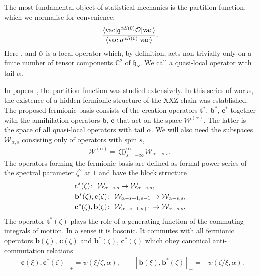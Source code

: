 \documentclass[pdftex]{sigma}
\numberwithin{equation}{section}
\begin{document}
The most fundamental object of statistical mechanics is the partition function, which we normalise for convenience:
\begin{align*}
\frac{\langle{\rm vac}| q^{\alpha S(0)} \mathcal{O} |{\rm vac}\rangle}{\langle{\rm vac}| q^{\alpha S(0)} |{\rm vac}\rangle}.
\end{align*}
Here , and $\mathcal{O}$ is a local operator which, by definition, acts non-trivially only on a finite number of tensor components $\mathbb{C}^{2}$ of $\mathfrak{h}_S$. We call  a quasi-local operator with tail $\alpha$.

In papers~\cite{HGS_4, HGS_1, HGS_2, HGS_3}, the partition function was studied extensively. In this series of works, the existence of a hidden fermionic structure of the XXZ chain was established. The proposed fermionic basis consists of the creation operators $\mathbf{t}^{*}$, $\mathbf{b}^{*}$, $\mathbf{c}^{*}$ together with the annihilation operators $\mathbf{b}$, $\mathbf{{c}}$ that act on the space $\mathcal{W}^{(\alpha)}$. The latter is the space of all quasi-local operators with tail $\alpha$. We will also need the subspaces $\mathcal{W}_{\alpha, s}$ consisting only of operators with spin $s$,
\begin{align*}
\mathcal{W}^{(\alpha)}=\bigoplus\limits_{s=-\infty}^{\infty} \mathcal{W}_{\alpha-s, s},
\end{align*}
The operators forming the fermionic basis are defined as formal power series of the spectral parameter $\zeta^2$ at $1$ and have the block structure
\begin{align*}
&\mathbf{t}^{*}(\zeta)                   \colon \ \mathcal{W}_{\alpha-s, s}   \rightarrow \mathcal{W}_{\alpha-s, s}, \\
&\mathbf{b}^{*}(\zeta), \mathbf{c}(\zeta)\colon \ \mathcal{W}_{\alpha-s+1, s-1} \rightarrow \mathcal{W}_{\alpha-s, s}, \cr
&\mathbf{c}^{*}(\zeta), \mathbf{b}(\zeta)\colon \ \mathcal{W}_{\alpha-s-1, s+1} \rightarrow \mathcal{W}_{\alpha-s, s}. \nonumber
\end{align*}
The operator $\mathbf{t}^{*}(\zeta)$ plays the role of a generating function of the commuting integrals of motion. In a sense it is bosonic. It commutes with all fermionic operators $\mathbf{b}(\zeta)$, $\mathbf{c}(\zeta)$ and $\mathbf{b}^{*}(\zeta)$, $\mathbf{c}^{*}(\zeta)$ which obey canonical anti-commutation relations
\begin{align}\label{Reminder_3}
[\mathbf{c}(\xi), \mathbf{c}^{*}(\zeta)]_{+}=\psi(\xi/\zeta, \alpha),
\qquad
[\mathbf{b}(\xi), \mathbf{b}^{*}(\zeta)]_{+}=-\psi(\zeta/\xi, \alpha).
\end{align}
\end{document}
